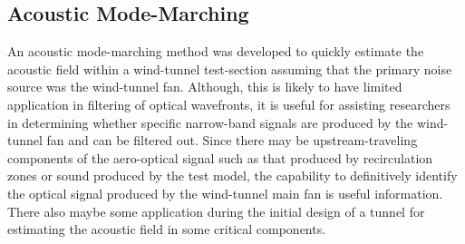 \subsection{Acoustic Mode-Marching}
An acoustic mode-marching method was developed to quickly estimate the acoustic field within a wind-tunnel test-section assuming that the primary noise source was the wind-tunnel fan.
Although, this is likely to have limited application in filtering of optical wavefronts, it is useful for assisting researchers in determining whether specific narrow-band signals are produced by the wind-tunnel fan and can be filtered out.
Since there may be upstream-traveling components of the aero-optical signal such as that produced by recirculation zones or sound produced by the test model, the capability to definitively identify the optical signal produced by the wind-tunnel main fan is useful information. 
There also maybe some application during the initial design of a tunnel for estimating the acoustic field in some critical components.
